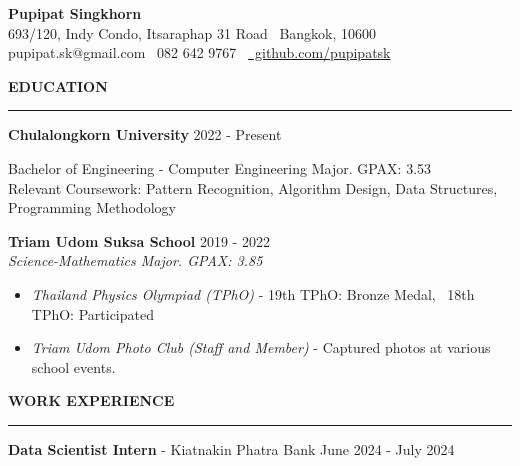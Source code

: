 \documentclass[11pt]{article}
\begin{document}
\begin{center}
    {\Large \textbf{Pupipat Singkhorn}}\\
    693/120, Indy Condo, Itsaraphap 31 Road \textbullet \ Bangkok, 10600 \\
    pupipat.sk@gmail.com \textbullet \ 082 642 9767 \textbullet\ \href{https://github.com/pupipatsk}{\faGithub\ github.com/pupipatsk}
\end{center}
\textbf{EDUCATION}
\vspace{5pt}
{\color{NavyBlue}\hrule}
\vspace{6pt}

\textbf{Chulalongkorn University} \hfill 2022 - Present

\hspace*{7pt} Bachelor of Engineering - Computer Engineering Major. GPAX: 3.53\\
\hspace*{7pt} Relevant Coursework: Pattern Recognition, Algorithm Design, Data Structures, Programming Methodology

\vspace{2pt}

\textbf{Triam Udom Suksa School} \hfill 2019 - 2022\\
\textit{Science-Mathematics Major. GPAX: 3.85}

\begin{itemize}[noitemsep, topsep=0pt, partopsep=0pt, parsep=0pt]
    \item \textit{Thailand Physics Olympiad (TPhO)} - 19th TPhO: Bronze Medal, \ 18th TPhO: Participated
    \item \textit{Triam Udom Photo Club (Staff and Member)} - Captured photos at various school events.
\end{itemize}

\vspace{9pt}
\textbf{WORK EXPERIENCE}
\vspace{5pt}
{\color{NavyBlue}\hrule}
\vspace{6pt}

\textbf{Data Scientist Intern} - Kiatnakin Phatra Bank \hfill June 2024 - July 2024
\end{document}
